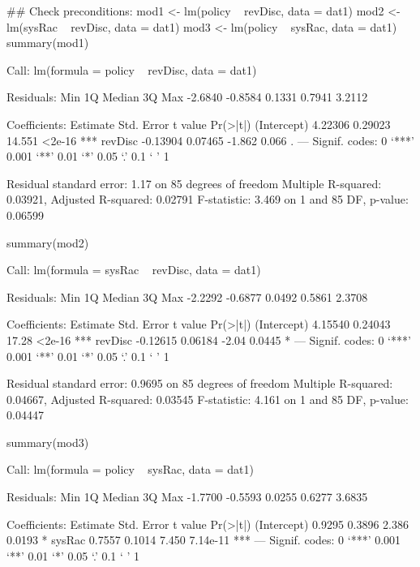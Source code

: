 \begin{Schunk}
\begin{Sinput}
 ## Check preconditions:
 mod1 <- lm(policy ~ revDisc, data = dat1)
 mod2 <- lm(sysRac ~ revDisc, data = dat1)
 mod3 <- lm(policy ~ sysRac, data = dat1)
 summary(mod1)
\end{Sinput}
\begin{Soutput}
Call:
lm(formula = policy ~ revDisc, data = dat1)

Residuals:
    Min      1Q  Median      3Q     Max 
-2.6840 -0.8584  0.1331  0.7941  3.2112 

Coefficients:
            Estimate Std. Error t value Pr(>|t|)    
(Intercept)  4.22306    0.29023  14.551   <2e-16 ***
revDisc     -0.13904    0.07465  -1.862    0.066 .  
---
Signif. codes:  0 ‘***’ 0.001 ‘**’ 0.01 ‘*’ 0.05 ‘.’ 0.1 ‘ ’ 1

Residual standard error: 1.17 on 85 degrees of freedom
Multiple R-squared:  0.03921,	Adjusted R-squared:  0.02791 
F-statistic: 3.469 on 1 and 85 DF,  p-value: 0.06599
\end{Soutput}
\begin{Sinput}
 summary(mod2)
\end{Sinput}
\begin{Soutput}
Call:
lm(formula = sysRac ~ revDisc, data = dat1)

Residuals:
    Min      1Q  Median      3Q     Max 
-2.2292 -0.6877  0.0492  0.5861  2.3708 

Coefficients:
            Estimate Std. Error t value Pr(>|t|)    
(Intercept)  4.15540    0.24043   17.28   <2e-16 ***
revDisc     -0.12615    0.06184   -2.04   0.0445 *  
---
Signif. codes:  0 ‘***’ 0.001 ‘**’ 0.01 ‘*’ 0.05 ‘.’ 0.1 ‘ ’ 1

Residual standard error: 0.9695 on 85 degrees of freedom
Multiple R-squared:  0.04667,	Adjusted R-squared:  0.03545 
F-statistic: 4.161 on 1 and 85 DF,  p-value: 0.04447
\end{Soutput}
\begin{Sinput}
 summary(mod3)
\end{Sinput}
\begin{Soutput}
Call:
lm(formula = policy ~ sysRac, data = dat1)

Residuals:
    Min      1Q  Median      3Q     Max 
-1.7700 -0.5593  0.0255  0.6277  3.6835 

Coefficients:
            Estimate Std. Error t value Pr(>|t|)    
(Intercept)   0.9295     0.3896   2.386   0.0193 *  
sysRac        0.7557     0.1014   7.450 7.14e-11 ***
---
Signif. codes:  0 ‘***’ 0.001 ‘**’ 0.01 ‘*’ 0.05 ‘.’ 0.1 ‘ ’ 1


\end{Soutput}
\end{Schunk}
